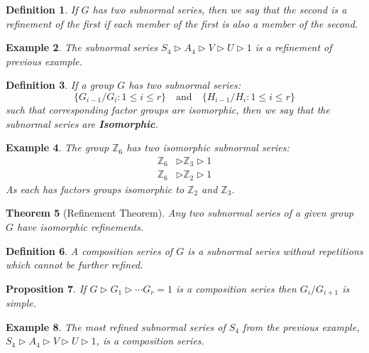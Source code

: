 \documentclass[a4paper,10pt]{article}
\newcommand{\ZZ}{\mathbb{Z}}
\newtheorem{thm}{Theorem}
\newtheorem{Def}[thm]{Definition}
\newtheorem{prop}[thm]{Proposition}
\newtheorem{eg}[thm]{Example}
\newtheorem{rem}[thm]{Remark}
\begin{document}
\begin{Def}
If $G$ has two subnormal series, then we say that the second is a refinement of the first if each member of the first is also a member of the second.
\end{Def}

\begin{eg}
The subnormal series $S_4 \triangleright A_4 \triangleright V \triangleright U \triangleright 1$ is a refinement of previous example.
\end{eg}

\begin{Def}
If a group $G$ has two subnormal series:
\[ \{ G_{i-1} / G_i : 1 \leq i \leq r \} \quad \text{and} \quad \{ H_{i-1} / H_i : 1 \leq i \leq r \} \]
such that corresponding factor groups are isomorphic, then we say that the subnormal series are \textbf{Isomorphic}.
\end{Def}

\begin{eg}
The group $\ZZ_6$ has two isomorphic subnormal series:
\begin{align*}
\ZZ_6 &\triangleright \ZZ_3 \triangleright 1 \\
\ZZ_6 &\triangleright \ZZ_2 \triangleright 1
\end{align*}
As each has factors groups isomorphic to $\ZZ_2$ and $\ZZ_3$. 
\end{eg}

\begin{thm}[Refinement Theorem]
Any two subnormal series of a given group $G$ have isomorphic refinements.
\end{thm}



\begin{Def}
A composition series of $G$ is a subnormal series without repetitions which cannot be further refined. 
\end{Def}

\begin{prop}
If $G \triangleright G_1 \triangleright \cdots G_r = 1$ is a composition series then $G_i / G_{i+1}$ is simple.
\end{prop}

\begin{eg}
The most refined subnormal series of $S_4$ from the previous example, $S_4 \triangleright A_4 \triangleright V \triangleright U \triangleright 1$, is a composition series.
\end{eg}
\end{document}
